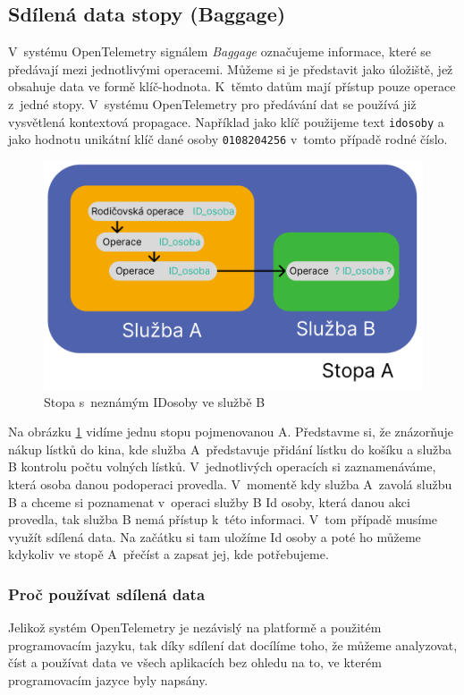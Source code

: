\subsection{Sdílená data stopy (Baggage)}

V~systému OpenTelemetry signálem \textit{Baggage} \cite{Baggage} označujeme informace, které se předávají mezi jednotlivými operacemi. Můžeme si je představit jako úložiště, jež obsahuje data ve formě klíč-hodnota. K~těmto datům mají přístup pouze operace z~jedné stopy. V~systému OpenTelemetry pro předávání dat se používá již vysvětlená kontextová propagace. Například jako klíč použijeme text \texttt{id\textunderscore osoby} a jako hodnotu unikátní klíč dané osoby \texttt{0108204256} v~tomto případě rodné číslo.


\begin{figure}[H]
  \centering
  \includegraphics[width=14cm]{obrazky-figures/baggage.png}
  \caption{Stopa s~neznámým ID\textunderscore osoby ve službě B}
  \label{fig:baggage}
\end{figure}


Na obrázku \ref{fig:baggage} vidíme jednu stopu pojmenovanou A. Představme si, že znázorňuje nákup lístků do kina, kde služba A~představuje přidání lístku do košíku a služba B kontrolu počtu volných lístků. V~jednotlivých operacích si zaznamenáváme, která osoba danou podoperaci provedla. V~momentě kdy služba A~zavolá službu B a chceme si poznamenat v~operaci služby B Id osoby, která danou akci provedla, tak služba B nemá přístup k~této informaci. V~tom případě musíme využít sdílená data. Na začátku si tam uložíme Id osoby a poté ho můžeme kdykoliv ve stopě A~přečíst a zapsat jej, kde potřebujeme.

\subsubsection{Proč používat sdílená data}
Jelikož systém OpenTelemetry je nezávislý na platformě a použitém programovacím jazyku, tak díky sdílení dat docílíme toho, že můžeme analyzovat, číst a používat data ve všech aplikacích bez ohledu na to, ve kterém programovacím jazyce byly napsány.

